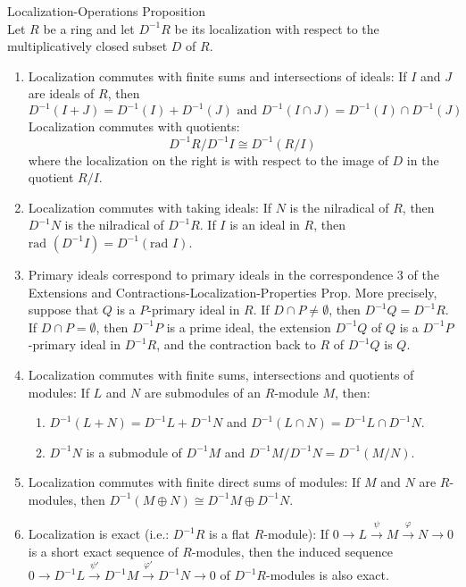 \begin{proposition}{Localization-Operations Proposition}\\
Let $R$ be a ring and let $D^{-1}R$ be its localization with respect to the multiplicatively closed subset $D$ of $R$.
\begin{enumerate}
    \item Localization commutes with finite sums and intersections of ideals: If $I$ and $J$ are ideals of $R$, then
    \[
    D^{-1} (I+J)=D^{-1}(I) +D^{-1}(J) \text{ and } D^{-1} (I\cap J)= D^{-1}(I) \cap D^{-1} (J)
    \]
    Localization commutes with quotients:
    \[
    D^{-1}R/D^{-1}I \cong D^{-1}(R/I)
    \]
    where the localization on the right is with respect to the image of $D$ in the quotient $R/I$.

    \item Localization commutes with taking ideals: If $N$ is the nilradical of $R$, then $D^{-1}N$ is the nilradical of $D^{-1}R$. If $I$ is an ideal in $R$, then $\text{rad } (D^{-1}I) =D^{-1} (\text{rad }I)$.

    \item Primary ideals correspond to primary ideals in the correspondence 3 of the Extensions and Contractions-Localization-Properties Prop. More precisely, suppose that $Q$ is a $P$-primary ideal in $R$. If $D\cap P \neq \emptyset$, then $D^{-1}Q= D^{-1}R$. If $D\cap P=\emptyset$, then $D^{-1}P$ is a prime ideal, the extension $D^{-1}Q$ of $Q$ is a $D^{-1}P$-primary ideal in $D^{-1}R$, and the contraction back to $R$ of $D^{-1}Q$ is $Q$.

    \item Localization commutes with finite sums, intersections and quotients of modules: If $L$ and $N$ are submodules of an $R$-module $M$, then:
    \begin{enumerate}
        \item $D^{-1}(L+N)=D^{-1}L+D^{-1}N$ and $D^{-1} (L \cap N)= D^{-1} L \cap D^{-1}N$.
        \item $D^{-1}N$ is a submodule of $D^{-1}M$ and $D^{-1}M/ D^{-1}N= D^{-1}(M/N)$.
    \end{enumerate}

    \item Localization commutes with finite direct sums of modules: If $M$ and $N$ are $R$-modules, then $D^{-1} (M \oplus N) \cong D^{-1}M \oplus D^{-1}N$.

    \item Localization is exact (i.e.: $D^{-1}R$ is a flat $R$-module): If $0 \to L \overset{\psi}{\to} M \overset{\varphi}{\to} N \to 0$ is a short exact sequence of $R$-modules, then the induced sequence $0 \to D^{-1}L \overset{\psi'}{\to} D^{-1}M \overset{\varphi'}{\to} D^{-1}N \to 0$ of $D^{-1}R$-modules is also exact.
\end{enumerate}
\end{proposition}

